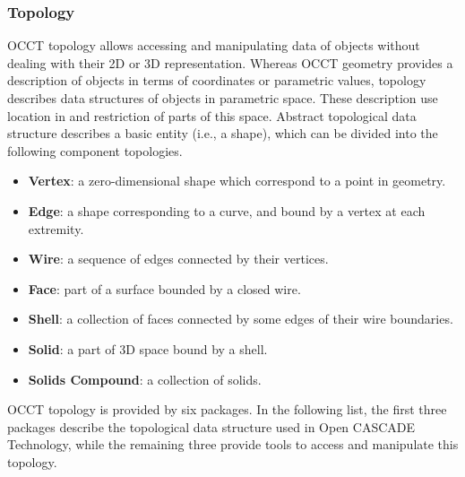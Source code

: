 \subsubsection{Topology}

\gls{OCCT} topology allows accessing and manipulating data of objects without dealing with their 2D or 3D representation. Whereas \gls{OCCT} geometry provides a description of objects in terms of coordinates or parametric values, topology describes data structures of objects in parametric space. These description use location in and restriction of parts of this space. Abstract topological data structure describes a basic entity (i.e., a shape), which can be divided into the following component topologies.
%
\begin{itemize}
\renewcommand\labelitemi{\tiny$\blacksquare$}
\item \textbf{Vertex}: a zero-dimensional shape which correspond to a point in geometry.
\item \textbf{Edge}: a shape corresponding to a curve, and bound by a vertex at each extremity.
\item \textbf{Wire}: a sequence of edges connected by their vertices.
\item \textbf{Face}: part of a surface bounded by a closed wire.
\item \textbf{Shell}: a collection of faces connected by some edges of their wire boundaries.
\item \textbf{Solid}: a part of 3D space bound by a shell.
\item \textbf{Solids Compound}: a collection of solids.
\end{itemize}
%
\gls{OCCT} topology is provided by six packages. In the following list, the first three packages describe the topological data structure used in Open CASCADE Technology, while the remaining three provide tools to access and manipulate this topology.
%
